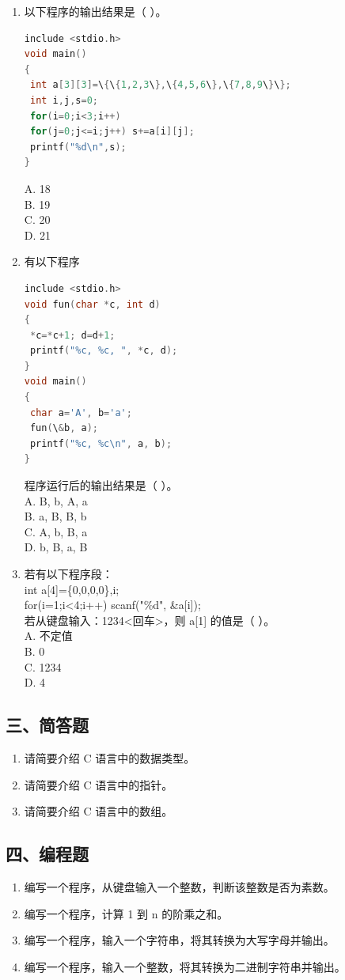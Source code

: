 \documentclass[a4paper,12pt]{article}
\begin{document}
\begin{enumerate}
    \item 以下程序的输出结果是（ ）。
    \begin{lstlisting}[language=C]
include <stdio.h>
void main()
{
 int a[3][3]=\{\{1,2,3\},\{4,5,6\},\{7,8,9\}\};
 int i,j,s=0;
 for(i=0;i<3;i++)
 for(j=0;j<=i;j++) s+=a[i][j];
 printf("%d\n",s);
}
    \end{lstlisting}
    A. 18 \\
    B. 19 \\
    C. 20 \\
    D. 21

    \item 有以下程序
    \begin{lstlisting}[language=C]
include <stdio.h>
void fun(char *c, int d)
{
 *c=*c+1; d=d+1;
 printf("%c, %c, ", *c, d);
}
void main()
{
 char a='A', b='a';
 fun(\&b, a);
 printf("%c, %c\n", a, b);
}
    \end{lstlisting}
    程序运行后的输出结果是（ ）。\\
    A. B, b, A, a \\
    B. a, B, B, b \\
    C. A, b, B, a \\
    D. b, B, a, B

    \item 若有以下程序段：\\
    int a[4]=\{0,0,0,0\},i;\\
    for(i=1;i<4;i++) scanf("\%d", \&a[i]);\\
    若从键盘输入：1234<回车>，则 a[1] 的值是（ ）。\\
    A. 不定值 \\
    B. 0 \\
    C. 1234 \\
    D. 4
\end{enumerate}

\subsection{三、简答题}
\begin{enumerate}
    \item 请简要介绍 C 语言中的数据类型。
    \item 请简要介绍 C 语言中的指针。
    \item 请简要介绍 C 语言中的数组。
\end{enumerate}

\subsection{四、编程题}
\begin{enumerate}
    \item 编写一个程序，从键盘输入一个整数，判断该整数是否为素数。
    \item 编写一个程序，计算 1 到 n 的阶乘之和。
    \item 编写一个程序，输入一个字符串，将其转换为大写字母并输出。
    \item 编写一个程序，输入一个整数，将其转换为二进制字符串并输出。
\end{enumerate}
\end{document}
